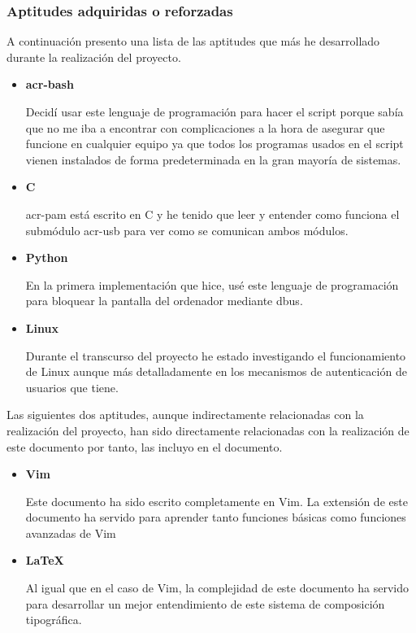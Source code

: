 \documentclass[twoside, titlepage, 12pt, a4paper]{article}
\begin{document}
\subsubsection{Aptitudes adquiridas o reforzadas}
A continuación presento una lista de las aptitudes que más he desarrollado durante la realización del proyecto.
\begin{itemize}
	\item{\textbf{\gls{acr-bash}}}\par Decidí usar este lenguaje de programación para hacer el \gls{script} porque sabía que no me iba a encontrar con complicaciones a la hora de asegurar que funcione en cualquier equipo ya que todos los programas usados en el script vienen instalados de forma predeterminada en la gran mayoría de sistemas.
	\item{\textbf{\gls{C}}}\par \gls{acr-pam} está escrito en \gls{C} y he tenido que leer y entender como funciona el submódulo \gls{acr-usb} para ver como se comunican ambos módulos.
	\item{\textbf{\gls{Python}}}\par En la primera implementación que hice, usé este lenguaje de programación para bloquear la pantalla del ordenador mediante \gls{dbus}.
	\item{\textbf{\gls{Linux}}}\par Durante el transcurso del proyecto he estado investigando el funcionamiento de \gls{Linux} aunque más detalladamente en los mecanismos de autenticación de usuarios que tiene.
\end{itemize}
Las siguientes dos aptitudes, aunque indirectamente relacionadas con la realización del proyecto, han sido directamente relacionadas con la realización de este documento por tanto, las incluyo en el documento.
\begin{itemize}
	\item{\textbf{\gls{Vim}}}\par Este documento ha sido escrito completamente en \gls{Vim}. La extensión de este documento ha servido para aprender tanto funciones básicas como funciones avanzadas de \gls{Vim}
	\item{\textbf{\LaTeX{}}}\par Al igual que en el caso de \gls{Vim}, la complejidad de este documento ha servido para desarrollar un mejor entendimiento de este sistema de composición tipográfica.
\end{itemize}
\end{document}
